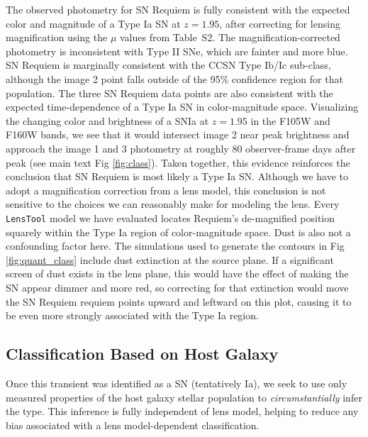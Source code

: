 \documentclass[12pt,dvipsnames]{article}
\def\SNABC{SN Requiem\xspace}
\begin{document}
The observed photometry for SN Requiem is fully consistent with the expected color and magnitude of a Type Ia SN at $z=1.95$, after correcting for lensing magnification using the $\mu$ values from Table~S2.  The magnification-corrected photometry is inconsistent with Type II SNe, which are fainter and more blue. SN Requiem is marginally consistent with the CCSN Type Ib/Ic sub-class, although the image 2 point falls outside of the 95\% confidence region for that population. The three SN Requiem data points are also consistent with the expected time-dependence  of a Type Ia SN in color-magnitude space. Visualizing the changing color and brightness of a SNIa at $z=1.95$ in the F105W and F160W bands, we see that it  would intersect image 2 near peak brightness and approach the image 1 and 3 photometry at roughly 80 observer-frame days after peak (see main text Fig \ref{fig:class}).  
Taken together, this evidence reinforces the conclusion that SN Requiem is most likely a Type Ia SN.  Although we have to adopt a magnification correction 
from a lens model, this conclusion is not sensitive to the choices we can reasonably make for modeling the lens.  Every  {\tt LensTool} model we have evaluated locates Requiem's de-magnified position squarely within the Type Ia region of color-magnitude space. Dust is also not a confounding factor here. 
The simulations used to generate the contours in Fig \ref{fig:quant_class} include dust extinction at the source plane.  If a significant screen of dust exists in the lens plane, this would have the effect of making the SN appear dimmer and more red, so correcting for that extinction would move the \SNABC requiem points upward and leftward on this plot, causing it to be even more strongly associated with the Type Ia region. 


\subsection*{Classification Based on Host Galaxy}
Once this transient was identified as a SN (tentatively Ia), we  seek to use only measured properties of the host galaxy stellar population to {\it circumstantially} infer the type. This inference is fully independent of lens model, helping to reduce any bias associated with a lens model-dependent classification. 
\end{document}

